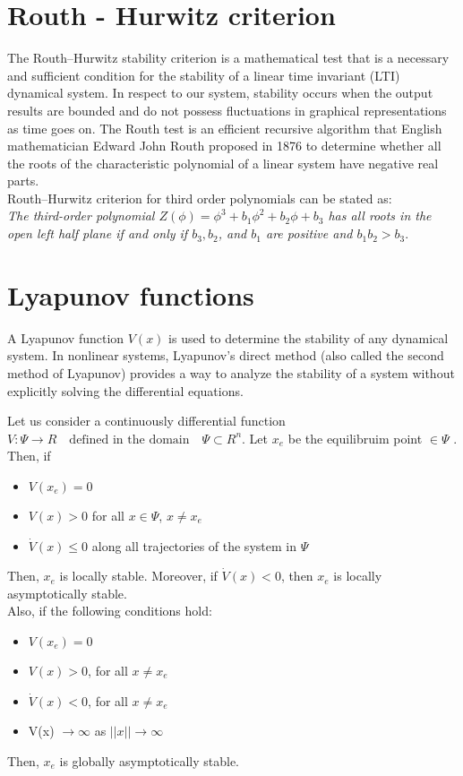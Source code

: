 \documentclass[12pt,a4wide]{report}
\numberwithin{equation}{chapter}
\numberwithin{theorem}{chapter}
\begin{document}
\section{Routh - Hurwitz criterion}
The Routh–Hurwitz stability criterion is a mathematical test that is a necessary and sufficient condition for the stability of a linear time invariant (LTI) dynamical system. In respect to our system, stability occurs when the output results are bounded and do not possess fluctuations in graphical representations as time goes on. The Routh test is an efficient recursive algorithm that English mathematician Edward John Routh proposed in 1876 to determine whether all the roots of the characteristic polynomial of a linear system have negative real parts.\\
Routh–Hurwitz criterion for third order polynomials can be stated as:\\
\textit{The third-order polynomial $Z(\phi)=\phi^{3}+b_{1}\phi^{2}+b_{2}\phi+b_{3}$ has all roots in the open left half plane if and only if $b_{3},b_{2}$, and $b_{1}$ are positive and $b_{1}b_{2}>b_{3}$}.
\section{Lyapunov functions}
A Lyapunov function $V(x)$ is used to determine the stability of any dynamical system.
In nonlinear systems, Lyapunov's direct method (also called the second method of Lyapunov) provides a way to analyze the stability of a system without explicitly solving the differential equations. 

Let us consider a continuously differential function $V:\Psi \rightarrow R \quad \text{defined in the domain} \quad \Psi \subset R^n$.
Let $x_e$ be the equilibruim point $\in \Psi$ .\\
Then, if
	\vspace{-.5cm}
\begin{itemize}
	\item $V(x_e) = 0$
	\item $V(x) > 0$ for all $x \in \Psi$, $x \neq x_e$
	\item $\dot V(x) \leq 0$ along all trajectories of the system in $\Psi$
\end{itemize}
	\vspace{-.5cm}
Then, $x_e$ is locally stable. Moreover, if $\dot V(x) < 0$, then $x_e$ is locally asymptotically stable.\\
Also, if the following conditions hold:
	\vspace{-.5cm}
\begin{itemize}
	\item $V(x_e) = 0$
	\item $V(x) > 0$, for all $x \neq x_e$
	\item $\dot V(x) < 0$, for all $x \neq x_e$
	\item V(x) $\rightarrow \infty$ as $||x|| \rightarrow \infty $
\end{itemize}
Then, $x_e$ is globally asymptotically stable.
\end{document}
